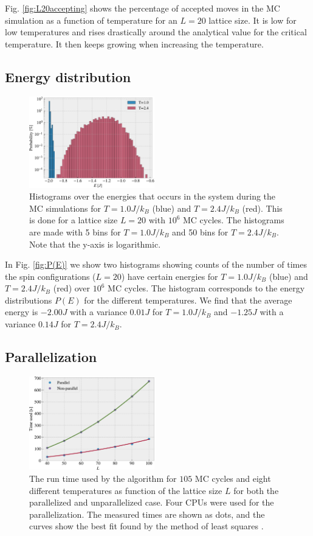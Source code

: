 \documentclass[%
 reprint,
nofootinbib,
aps,
]{revtex4-1}
\begin{document}
Fig. \vref{fig:L20accepting} shows the percentage of accepted moves in the MC simulation as a function of temperature for an $L = 20$ lattice size. It is low for low temperatures and rises drastically around the analytical value for the critical temperature. It then keeps growing when increasing the temperature.

\subsection{Energy distribution}
\begin{figure}
\includegraphics[width=0.485\textwidth]{../figures/problem_d.pdf}
\caption{Histograms over the energies that occurs in the system during the MC simulations for $T = 1.0J/k_B$ (blue) and $T = 2.4J/k_B$ (red). This is done for a lattice size $L = 20$ with $10^6$ MC cycles. The histograms are made with 5 bins for $T = 1.0J/k_B$ and 50 bins for $T = 2.4J/k_B$. Note that the y-axis is logarithmic.}
\label{fig:P(E)}
\end{figure}

In Fig. \vref{fig:P(E)} we show two histograms showing counts of the number of times the spin configurations ($L = 20$) have certain energies for $T = 1.0J/k_B$ (blue) and $T = 2.4J/k_B$ (red) over $10^6$ MC cycles. The histogram corresponds to the energy distributions $P(E)$ for the different temperatures. We find that the average energy is $-2.00J$ with a variance $0.01J$ for $T = 1.0J/k_B$ and $-1.25J$ with a variance $0.14J$ for $T = 2.4J/k_B$.


\subsection{Parallelization}

\begin{figure}
\includegraphics[width=0.485\textwidth]{../figures/timer.pdf}
\caption{The run time used by the algorithm for $105$ MC cycles and eight different temperatures as function of the lattice size $L$ for both the parallelized and unparallelized case. Four CPUs were used for the parallelization. The measured times are shown as dots, and the curves show the best fit found by the method of least squares \cite{squires}.}
\label{fig:timer}
\end{figure}
\end{document}
